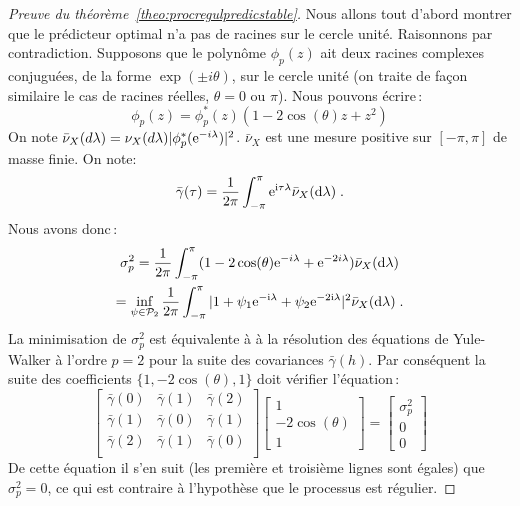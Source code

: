 \begin{proof}[Preuve du th\'eor\`eme~\ref{theo:procregulpredicstable}]
\smartqed
Nous allons tout d'abord montrer que le pr\'edicteur optimal n'a pas
de racines sur le cercle unit\'e. Raisonnons par contradiction.
Supposons que le polyn\^ome $\phi_p(z)$ ait deux racines
complexes conjugu\'ees, de la forme $\exp(\pm i\theta)$, sur le
cercle unit\'e (on traite de fa\c{c}on similaire le cas de racines
r\'eelles, $\theta= 0$ ou $\pi$). Nous pouvons \'ecrire\,:
\[
 \phi_p(z) = \phi^*_p(z) (1 - 2 \cos(\theta) z + z^2)
\]
On note $\bar{\nu}_X(d \lambda) = \nu_X(d \lambda) |\phi^*_p(\mathrm{e}^{-i
\lambda})|^2$. $\bar{\nu}_X$ est une mesure positive sur
$[-\pi,\pi]$ de masse finie. On note:
\[
 \bar{\gamma}(\tau) = \frac{1}{2 \pi} \int_{- \pi}^{\pi}
 \mathrm{e}^{\mathrm{i} \tau \lambda} \bar{\nu}_X(\mathrm{d} \lambda)\;.
\]
Nous avons donc\,:
\begin{multline*}
 \sigma_p^2 = \frac{1}{2 \pi} \int_{-\pi}^\pi
                  (1 - 2 \cos(\theta) \mathrm{e}^{-i \lambda} + \mathrm{e}^{-2 i \lambda})
                  \bar{\nu}_X(\mathrm{d} \lambda)\\
           = \inf_{\psi \in \mathcal{P}_2} \frac{1}{2 \pi}
           \int_{-\pi}^\pi
           |1 + \psi_1 \mathrm{e}^{-\mathrm{i}\lambda} + \psi_2 \mathrm{e}^{-2 \mathrm{i} \lambda}|^2
             \bar{\nu}_X(\mathrm{d} \lambda) \;.
\end{multline*}
La minimisation de $\sigma_p^2$ est équivalente à
\`a la r\'esolution des \'equations de Yule-Walker \`a
l'ordre $p=2$ pour la suite des covariances $\bar{\gamma}(h)$.
Par cons\'equent la suite des coefficients $\{1,-2\cos(\theta),1\}$
doit v\'erifier l'\'equation\,:
\[
\left[
\begin{array}{ccc}
\bar{\gamma}(0) & \bar{\gamma}(1) & \bar{\gamma}(2) \\
\bar{\gamma}(1) & \bar{\gamma}(0) & \bar{\gamma}(1) \\
\bar{\gamma}(2) & \bar{\gamma}(1) & \bar{\gamma}(0) \\
\end{array}
\right] \left[
\begin{array}{c}
1 \\
-2 \cos(\theta) \\
1
\end{array}
\right] = \left[
\begin{array}{c}
\sigma_p^2 \\
0 \\
0
\end{array}
\right]
\]
De cette \'equation il s'en suit (les premi\`ere et troisi\`eme
lignes sont \'egales) que $\sigma_p^2=0$, ce qui est contraire \`a
l'hypoth\`ese que le processus est r\'egulier.


\end{proof}
